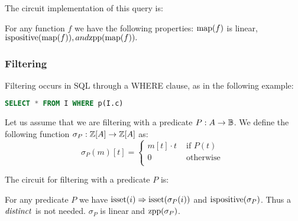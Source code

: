 The circuit implementation of this query is:

\begin{center}
\end{center}

For any function $f$ we have the following properties:
$\mbox{map}(f)$ is linear, $\mbox{ispositive}(\mbox{map}(f)), and \mbox{zpp}(\mbox{map}(f)).$

\subsubsection{Filtering}

Filtering occurs in SQL through a WHERE clause, as in the following example:

\noindent
\begin{lstlisting}[language=SQL]
SELECT * FROM I WHERE p(I.c)
\end{lstlisting}

Let us assume that we are filtering with a predicate 
$P: A \rightarrow \mathbb{B}$.  We define the following function $\sigma_P: \mathbb{Z}[A] \rightarrow \mathbb{Z}[A]$ as:
$$\sigma_P(m)[t] = \left\{
\begin{array}{ll}
  m[t] \cdot t & \mbox{ if } P(t) \\
  0 & \mbox{ otherwise } \\
\end{array}
\right.
$$

The circuit for filtering with a predicate $P$ is:

\begin{center}
\end{center}

For any predicate $P$ we have $\mbox{isset}(i) \Rightarrow
\mbox{isset}(\sigma_P(i))$ and $\mbox{ispositive}(\sigma_P)$.  Thus a $\mathit{distinct}$
is not needed.  $\sigma_P$ is linear and $\mbox{zpp}(\sigma_P)$.

